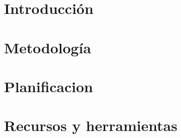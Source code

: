 \section{Introducción}


\section{Metodología}


\section{Planificacion}


\section{Recursos y herramientas}

